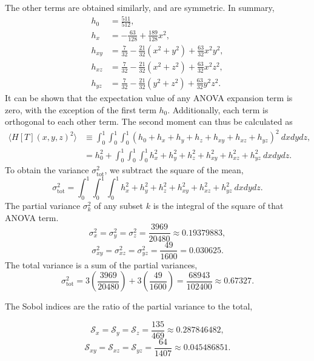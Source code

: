 The other terms are obtained similarly, and are symmetric.  In summary,
\begin{align}
  h_0 &= \frac{511}{512}, \\
  h_x &= -\frac{63}{128} + \frac{189}{128}x^2, \\
  h_{xy} &= \frac{7}{32} - \frac{21}{32}(x^2+y^2) + \frac{63}{32}x^2y^2, \\
  h_{xz} &= \frac{7}{32} - \frac{21}{32}(x^2+z^2) + \frac{63}{32}x^2z^2, \\
  h_{yz} &= \frac{7}{32} - \frac{21}{32}(y^2+z^2) + \frac{63}{32}y^2z^2.
\end{align}
It can be shown that the expectation value of any ANOVA expansion term is zero, with the exception of the
first term $h_0$.  Additionally, each term is orthogonal to each other term.  The second moment can thus be
calculated as
\begin{align}
  \langle H[T](x,y,z)^2\rangle &\equiv \int_0^1\int_0^1\int_0^1 (h_0+h_x+h_y+h_z+h_{xy}+h_{xz}+h_{yz})^2\
  dxdydz, \nonumber\\
  &= h_0^2+\int_0^1\int_0^1\int_0^1 h_x^2+h_y^2+h_z^2+h_{xy}^2+h_{xz}^2+h_{yz}^2\ dxdydz.
\end{align}
To obtain the variance $\sigma_\text{tot}^2$, we subtract the square of the mean,
\begin{equation}
  \sigma_\text{tot}^2 = \int_0^1\int_0^1\int_0^1 h_x^2+h_y^2+h_z^2+h_{xy}^2+h_{xz}^2+h_{yz}^2\ dxdydz.
\end{equation}
The partial variance $\sigma_k^2$ of any subset $k$ is the integral of the square of that ANOVA term.
\begin{equation}
  \sigma_x^2 = \sigma_y^2 = \sigma_z^2 = \frac{3969}{20480} \approx0.19379883,
\end{equation}
\begin{equation}
  \sigma_{xy}^2 = \sigma_{xz}^2 = \sigma_{yz}^2 = \frac{49}{1600} =0.030625.
\end{equation}
The total variance is a sum of the partial variances,
\begin{equation}
  \sigma_\text{tot}^2 = 3\left(\frac{3969}{20480}\right) + 3\left(\frac{49}{1600}\right) =
  \frac{68943}{102400} \approx 0.67327.
\end{equation}

The Sobol indices are the ratio of the partial variance to the total,

\begin{equation}
  \mathcal{S}_x =\mathcal{S}_y = \mathcal{S}_z = \frac{135}{469} \approx 0.287846482, 
\end{equation}
\begin{equation}
  \mathcal{S}_{xy} =\mathcal{S}_{xz} = \mathcal{S}_{yz} = \frac{64}{1407} \approx 0.045486851. 
\end{equation}
%
%
%
%
%
%
%
